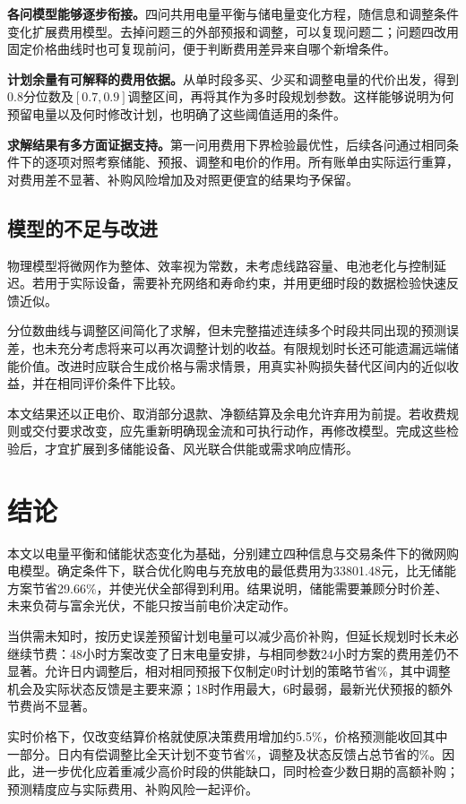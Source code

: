 \textbf{各问模型能够逐步衔接。}四问共用电量平衡与储电量变化方程，随信息和调整条件变化扩展费用模型。去掉问题三的外部预报和调整，可以复现问题二；问题四改用固定价格曲线时也可复现前问，便于判断费用差异来自哪个新增条件。

\textbf{计划余量有可解释的费用依据。}从单时段多买、少买和调整电量的代价出发，得到0.8分位数及$[0.7,0.9]$调整区间，再将其作为多时段规划参数。这样能够说明为何预留电量以及何时修改计划，也明确了这些阈值适用的条件。

\textbf{求解结果有多方面证据支持。}第一问用费用下界检验最优性，后续各问通过相同条件下的逐项对照考察储能、预报、调整和电价的作用。所有账单由实际运行重算，对费用差不显著、补购风险增加及对照更便宜的结果均予保留。

\subsection{模型的不足与改进}

物理模型将微网作为整体、效率视为常数，未考虑线路容量、电池老化与控制延迟。若用于实际设备，需要补充网络和寿命约束，并用更细时段的数据检验快速反馈近似。

分位数曲线与调整区间简化了求解，但未完整描述连续多个时段共同出现的预测误差，也未充分考虑将来可以再次调整计划的收益。有限规划时长还可能遗漏远端储能价值。改进时应联合生成价格与需求情景，用真实补购损失替代区间内的近似收益，并在相同评价条件下比较。

本文结果还以正电价、取消部分退款、净额结算及余电允许弃用为前提。若收费规则或交付要求改变，应先重新明确现金流和可执行动作，再修改模型。完成这些检验后，才宜扩展到多储能设备、风光联合供能或需求响应情形。

\section{结论}

本文以电量平衡和储能状态变化为基础，分别建立四种信息与交易条件下的微网购电模型。确定条件下，联合优化购电与充放电的最低费用为33801.48元，比无储能方案节省29.66\%，并使光伏全部得到利用。结果说明，储能需要兼顾分时价差、未来负荷与富余光伏，不能只按当前电价决定动作。

当供需未知时，按历史误差预留计划电量可以减少高价补购，但延长规划时长未必继续节费：48小时方案改变了日末电量安排，与相同参数24小时方案的费用差仍不显著。允许日内调整后，相对相同预报下仅制定0时计划的策略节省\QThreeSavingPlanOnlyPercent\%，其中调整机会及实际状态反馈是主要来源；18时作用最大，6时最弱，最新光伏预报的额外节费尚不显著。

实时价格下，仅改变结算价格就使原决策费用增加约5.5\%，价格预测能收回其中一部分。日内有偿调整比全天计划不变节省\QFourThreeVsTwoPercent\%，调整及状态反馈占总节省的\QFourAdjustShareOfSaving\%。因此，进一步优化应着重减少高价时段的供能缺口，同时检查少数日期的高额补购；预测精度应与实际费用、补购风险一起评价。
